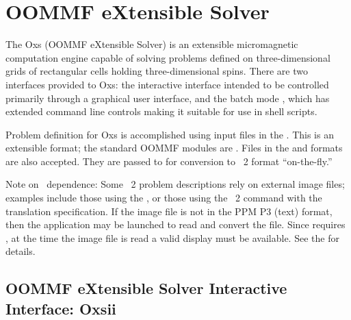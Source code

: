 \section{OOMMF eXtensible Solver}\label{sec:oxs}%
%
The Oxs (OOMMF eXtensible Solver) is an extensible micromagnetic
computation engine capable of solving problems defined on
three-dimensional grids of rectangular cells holding three-dimensional
spins.  There are two interfaces provided to Oxs: the interactive
interface
intended to be controlled primarily through a graphical
user interface, and the batch mode
, which has extended
command line controls making it suitable for use in shell scripts.

Problem definition for Oxs is accomplished using input files in the
.
This is an extensible format; the standard OOMMF modules are
.
Files in the  and
 formats are also accepted.  They are
passed to  for conversion to \MIF~2 format
``on-the-fly.''

Note on \Tk\ dependence: Some \MIF~2 problem descriptions rely on
external image files; examples
include those using the
%
, or those using the \MIF~2
 command with the 
translation specification.
If the image file is not in the PPM P3 (text) format, then the
 application may be
launched to read and convert the file.  Since 
requires \Tk, at the
time the image file is read a valid display must be available.  See the
{} for details.

\subsection{OOMMF eXtensible Solver Interactive Interface:
Oxsii}\label{sec:oxsii}%

